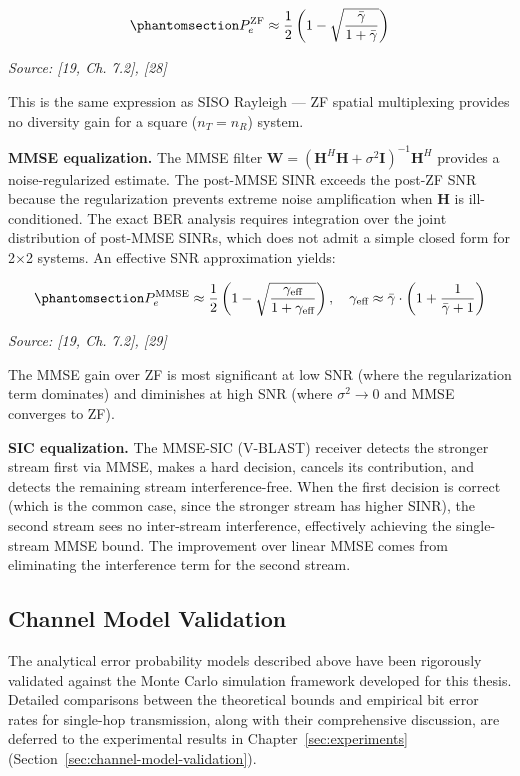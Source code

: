 \begin{equation}\protect\phantomsection\label{eq:zf-ber-mimo}{P_e^{\text{ZF}} \approx \frac{1}{2}\left(1 - \sqrt{\frac{\bar{\gamma}}{1 + \bar{\gamma}}}\right)
}\end{equation} \par{\small\textit{Source: [19, Ch. 7.2], [28]}}

This is the same expression as SISO Rayleigh --- ZF spatial multiplexing provides no diversity gain for a square (\(n_T = n_R\)) system.

\textbf{MMSE equalization.} The MMSE filter \(\mathbf{W} = (\mathbf{H}^H\mathbf{H} + \sigma^2\mathbf{I})^{-1}\mathbf{H}^H\) provides a noise-regularized estimate. The post-MMSE SINR exceeds the post-ZF SNR because the regularization prevents extreme noise amplification when \(\mathbf{H}\) is ill-conditioned. The exact BER analysis requires integration over the joint distribution of post-MMSE SINRs, which does not admit a simple closed form for 2×2 systems. An effective SNR approximation yields:

\begin{equation}\protect\phantomsection\label{eq:mmse-ber-mimo}{P_e^{\text{MMSE}} \approx \frac{1}{2}\left(1 - \sqrt{\frac{\gamma_{\text{eff}}}{1 + \gamma_{\text{eff}}}}\right), \quad \gamma_{\text{eff}} \approx \bar{\gamma} \cdot \left(1 + \frac{1}{\bar{\gamma} + 1}\right)
}\end{equation} \par{\small\textit{Source: [19, Ch. 7.2], [29]}}

The MMSE gain over ZF is most significant at low SNR (where the regularization term dominates) and diminishes at high SNR (where \(\sigma^2 \to 0\) and MMSE converges to ZF).

\textbf{SIC equalization.} The MMSE-SIC (V-BLAST) receiver detects the stronger stream first via MMSE, makes a hard decision, cancels its contribution, and detects the remaining stream interference-free. When the first decision is correct (which is the common case, since the stronger stream has higher SINR), the second stream sees no inter-stream interference, effectively achieving the single-stream MMSE bound. The improvement over linear MMSE comes from eliminating the interference term for the second stream.


\subsection{Channel Model Validation}
The analytical error probability models described above have been rigorously validated against the Monte Carlo simulation framework developed for this thesis. Detailed comparisons between the theoretical bounds and empirical bit error rates for single-hop transmission, along with their comprehensive discussion, are deferred to the experimental results in Chapter~\ref{sec:experiments} (Section~\ref{sec:channel-model-validation}).

